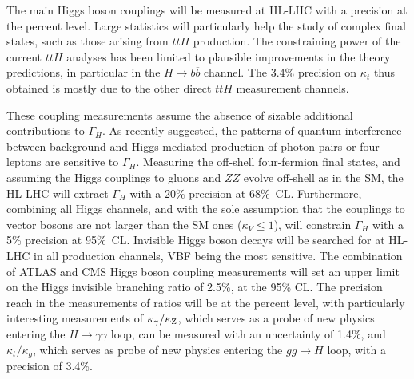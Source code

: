 \documentclass[../report.tex]{subfiles}
\begin{document}
The main Higgs boson couplings will be measured at HL-LHC with a precision at the percent level. Large statistics will particularly help the study of complex final states, such as those arising from $ttH$ production. 
The constraining power of the current $ttH$ analyses has been limited to plausible improvements in the theory predictions, in particular in the $H\rightarrow b\overline{b}$ channel. The 3.4\% precision on $\kappa_t$ thus obtained is mostly due to the other direct $ttH$ measurement channels.


These coupling measurements assume the absence of sizable additional contributions to $\Gamma_H$. As recently suggested, the patterns of quantum interference between background and Higgs-mediated production of photon pairs or four leptons are sensitive to $\Gamma_H$. Measuring the off-shell four-fermion final states, and assuming the Higgs couplings to gluons and $ZZ$ evolve off-shell as in the SM, the HL-LHC will extract $\Gamma_H$ with a 20\% precision at 68\%~CL.
Furthermore, combining all Higgs channels, and with the sole assumption that the couplings to vector bosons are not  larger than the SM ones ($\kappa_V\le 1$), will constrain $\Gamma_H$ with a 5\% precision at 95\%~CL. Invisible Higgs boson decays will be searched for at HL-LHC in all production channels, VBF being the most sensitive. The combination of ATLAS and CMS Higgs boson coupling measurements will set an upper limit on the Higgs invisible branching ratio of 2.5\%, at the 95\% CL.  The precision reach in the measurements of ratios will be at the percent level, with particularly interesting measurements of $\kappa_{\gamma}/\kappa_{\rm Z}$, which serves as a probe of new physics entering the $H \rightarrow \gamma\gamma$ loop, can be measured with an uncertainty of 1.4\%, and $\kappa_{t}/\kappa_{g}$, which serves as probe of new physics entering the $gg \rightarrow H$ loop, with a precision of 3.4\%.
\end{document}
